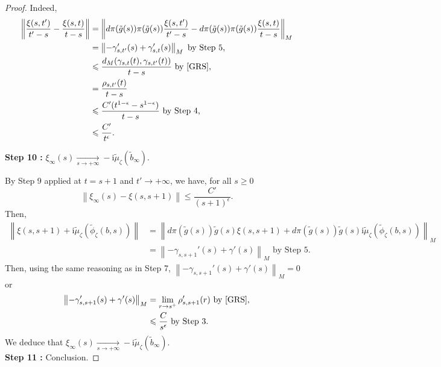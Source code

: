 \documentclass{article}
\theoremstyle{remark}
\theoremstyle{definition}
\newcommand{\tend}[2]{\underset{#1 \rightarrow #2}{\longrightarrow}}
\renewcommand{\i}{\boldsymbol{\mathrm{i}}}
\newcommand{\norme}[1]{\left\| #1 \right\|}
\renewcommand{\leq}{\leqslant}
\renewcommand{\geq}{\geqslant}
\begin{document}
\begin{proof}
Indeed,
\begin{align*}
    \norme{\frac{\xi(s,t')}{t' - s} - \frac{\xi(s,t)}{t - s}} & = \norme{d\pi(\tilde{g}(s))\pi(\tilde{g}(s))\frac{\xi(s,t')}{t' - s} - d\pi(\tilde{g}(s))\pi(\tilde{g}(s))\frac{\xi(s,t)}{t - s}}_M\\
    & = \norme{-\gamma_{s,t'}'(s) + \gamma_{s,t}'(s)}_M \textrm{ by Step 5,}\\
    & \leq \frac{d_M(\gamma_{s,t}(t),\gamma_{s,t'}(t))}{t - s} \textrm{ by \cite[Lemma A.4]{GRS},}\\
    & = \frac{\rho_{s,t'}(t)}{t - s}\\
    & \leq \frac{C'(t^{1 - \epsilon} - s^{1 - \epsilon})}{t - s} \textrm{ by Step 4,}\\
    & \leq \frac{C'}{t^\epsilon}.
\end{align*}

\noindent\textbf{Step 10 :} $\xi_\infty(s) \tend{s}{+\infty} -\i\tilde{\mu}_\zeta(\tilde{b}_\infty)$.

By Step 9 applied at $t = s + 1$ and $t' \rightarrow +\infty$, we have, for all $s \geq 0$
$$
\norme{\xi_\infty(s) - \xi(s,s + 1)} \leq \frac{C'}{(s + 1)^\epsilon}.
$$
Then,
\begin{align*}
    \norme{\xi(s,s + 1) + \i\tilde{\mu}_\zeta(\tilde{\phi}_\zeta(b,s))} & = \norme{d\pi(\tilde{g}(s))\tilde{g}(s)\xi(s,s + 1) + d\pi(\tilde{g}(s))\tilde{g}(s)\i\tilde{\mu}_\zeta(\tilde{\phi}_\zeta(b,s))}_M\\
    & = \norme{-\gamma_{s,s + 1}'(s) + \gamma'(s)}_M \textrm{ by Step 5.}
\end{align*}
Then, using the same reasoning as in Step 7, $\norme{-\gamma_{s,s + 1}'(s) + \gamma'(s)}_M = 0$ or
\begin{align*}
    \norme{-\gamma_{s,s + 1}'(s) + \gamma'(s)}_M & = \lim_{r \rightarrow s^+} \rho_{s,s + 1}'(r) \textrm{ by \cite[Lemma A.3]{GRS},}\\
    & \leq \frac{C}{s^\epsilon} \textrm{ by Step 3.}
\end{align*}
We deduce that $\xi_\infty(s) \tend{s}{+\infty} -\i\tilde{\mu}_\zeta(\tilde{b}_\infty)$.\\

\noindent\textbf{Step 11 :} Conclusion.


\end{proof}
\end{document}
